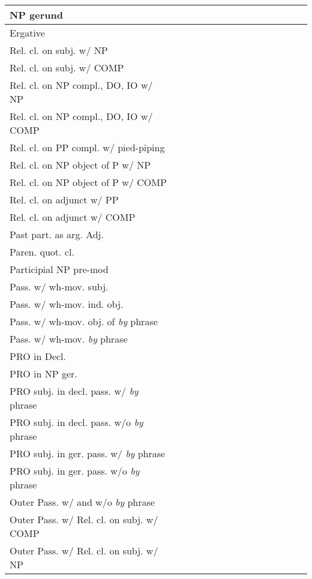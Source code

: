 \begin{center}
\begin{tabular}{|p{2.4in}||*{14}{c|}}
\hline
NP gerund & & & & & & & & & & & & & & \\
\hline
Ergative & & & & & & & & & & & & & & \\
\hline
Rel. cl. on subj. w/ NP & & & & & & & & & & & & & & \\
\hline
Rel. cl. on subj. w/ COMP & & & & & & & & & & & & & & \\
\hline
Rel. cl. on NP compl., DO, IO w/ NP & & & & & & & & & & & & & & \\
\hline
Rel. cl. on NP compl., DO, IO w/ COMP & & & & & & & & & & & & & & \\
\hline
Rel. cl. on PP compl. w/ pied-piping & & & & & & & & & & & & & & \\
\hline
Rel. cl. on NP object of P w/ NP & & & & & & & & & & & & & & \\
\hline
Rel. cl. on NP object of P w/ COMP & & & & & & & & & & & & & & \\
\hline
Rel. cl. on adjunct w/ PP & & & & & & & & & & & & & & \\
\hline
Rel. cl. on adjunct w/ COMP & & & & & & & & & & & & & & \\
\hline
Past part. as arg. Adj. & & & & & & & & & & & & & & \\
\hline
Paren. quot. cl. & & & & & & & & & & & & & & \\
\hline
Participial NP pre-mod & & & & & & & & & & & & & & \\
\hline
Pass. w/ wh-mov. subj. & & & & & & & & & & & & & & \\
\hline
Pass. w/ wh-mov. ind. obj. & & & & & & & & & & & & & & \\
\hline
Pass. w/ wh-mov. obj. of  {\it by} phrase & & & & & & & & & & & & & & \\
\hline
Pass. w/ wh-mov. {\it by} phrase & & & & & & & & & & & & & & \\
\hline
PRO in Decl. & & & & & & & & & & & & & & \\
\hline
PRO in NP ger. & & & & & & & & & & & & & & \\
\hline
PRO subj. in decl. pass. w/ {\it by} phrase & & & & & & & & & & & & & & \\
\hline
PRO subj. in decl. pass. w/o {\it by} phrase & & & & & & & & & & & & & & \\
\hline
PRO subj. in ger. pass. w/ {\it by} phrase & & & & & & & & & & & & & & \\
\hline
PRO subj. in ger. pass. w/o {\it by} phrase & & & & & & & & & & & & & & \\
\hline
Outer Pass. w/ and w/o {\it by} phrase & & & & & & & & & & & & & & \\
\hline
Outer Pass. w/ Rel. cl. on subj. w/ COMP & & & & & & & & & & & & & & \\
\hline
Outer Pass. w/ Rel. cl. on subj. w/ NP & & & & & & & & & & & & & & \\
\hline
\end{tabular}
\end{center}




